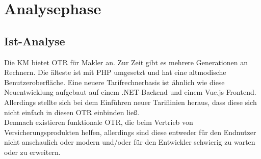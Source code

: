 \newpage
\section{Analysephase}
\label{analysephase}

\subsection{Ist-Analyse}
\label{ist}
\begin{comment}
Wie eingangs in Kapitel \ref{projektumfeld} kurz erwähnt, verwendet \ac{SAZ} ein \ac{ERP}-System, welches regelmäßige Updates erhält und individuell angepasst werden kann. Durch die individuellen Anpassungen muss nach jedem Update, vor Produktivsetzung, ein Test durch die Anwender erfolgen. Die Resonanz dieser Testläufe, sowie die nachgelagerte Kommunikation aus Emails und ggf. Telefonaten, werden zurzeit über ein Exchange-Postfach verwaltet. Die eingehenden Rückmeldungen werden von den Entwicklern zu Aufgaben formuliert, anschließend kategorisiert, kommentiert und in einer Excel-Datei gelistet, welche als Grundlage zur weiteren Bearbeitung und Lösung der Problemstellungen dient.  Die Kategorisierung erfolgt auf Basis der Dringlichkeit. Tasks, die in der Produktivsetzung die Arbeit einschränken würden, werden vorrangig bearbeitet. Die Excel-Datei erhält zusätzlich eine farbliche Kategorisierung, sodass die Entwickler in kurzer Zeit einen Überblick erhalten, welche Tasks abgeschlossen, behoben, in Bearbeitung sind oder mit dem \ac{ERP}-Hersteller besprochen werden müssen. Die Liste beinhaltet noch weitere Informationen. Entwickler können für die einzelnen Tasks Kommentare, Workarounds und Testbeschreibungen verfassen und zusätzlich Dateipfade für weitere Materialien, wie z.B. Screenshots von Fehlermeldungen, hinterlegen. Einen hohen Stellenwert nimmt dabei die Spalte der Kommentare ein, denn häufig erfolgen Rückfragen durch die Entwickler, da die Rückmeldungen der Anwender keiner einheitlichen Form folgen und teilweise notwendige Informationen zur Problemlösung fehlen. Zu beachten ist, dass auch zur aktuellen produktiv laufenden Version, Anfragen von Anwendern eintreffen, die nach dem identischen Schema verarbeitet werden. Diese Vorgehensweise, der Protokollierung in einer Excel-Datei, Kommunikation über ein Exchange-Postfach und die nicht einheitliche Form der Meldung bindet unnötig Ressourcen und verlängert die Projektzeit teilweise erheblich.	
\end{comment}
Die \ac{KM} bietet \ac{OTR} für Makler an. Zur Zeit gibt es mehrere Generationen an Rechnern. Die älteste ist mit PHP umgesetzt und hat eine altmodische Benutzeroberfläche. Eine neuere Tarifrechnerbasis ist ähnlich wie diese Neuentwicklung aufgebaut auf einem .NET-Backend und einem Vue.js Frontend. Allerdings stellte sich bei dem Einführen neuer Tariflinien heraus, dass diese sich nicht einfach in diesen \ac{OTR} einbinden ließ. \\
Demnach existieren funktionale \ac{OTR}, die beim Vertrieb von Versicherungsprodukten helfen, allerdings sind diese entweder für den Endnutzer nicht anschaulich oder modern und/oder für den Entwickler schwierig zu warten oder zu erweitern.

